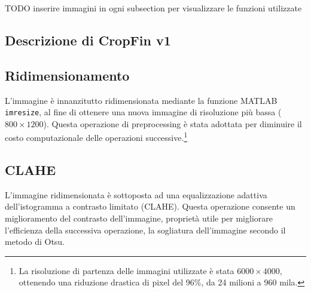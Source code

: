 TODO inserire immagini in ogni subsection per visualizzare le funzioni utilizzate

\subsection{Descrizione di CropFin v1}
\label{descrizioneCropFin}
\subsection*{Ridimensionamento}
L'immagine è innanzitutto ridimensionata mediante la funzione MATLAB \verb|imresize|, al fine di ottenere una nuova immagine di risoluzione più bassa ($800\times 1200$).
Questa operazione di preprocessing è stata adottata per diminuire il costo computazionale delle operazioni successive.\footnote{La risoluzione di partenza delle immagini utilizzate è stata $6000\times 4000$, ottenendo una riduzione drastica di pixel del 96\%, da 24 milioni a 960 mila.}


\subsection*{CLAHE}
L'immagine ridimensionata è sottoposta ad una equalizzazione adattiva dell’istogramma a contrasto limitato (CLAHE). Questa operazione consente un miglioramento del contrasto dell'immagine, proprietà utile per migliorare l'efficienza della successiva operazione, la sogliatura dell'immagine secondo il metodo di Otsu.

